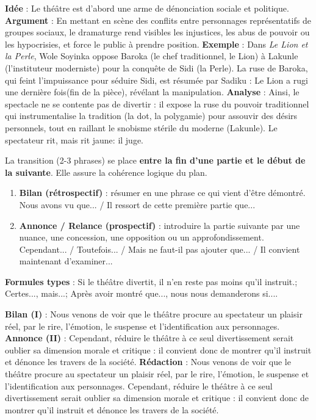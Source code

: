 \documentclass[11pt]{article}
\newcommand{\cle}[1]{{\popxbold\color{popdark}#1}}
\begin{document}
\begin{exoresolu}
\tcblower
\textbf{Idée} : Le théâtre est d'abord une arme de dénonciation sociale et politique.
\textbf{Argument} : En mettant en scène des conflits entre personnages représentatifs de groupes sociaux, le dramaturge rend visibles les injustices, les abus de pouvoir ou les hypocrisies, et force le public à prendre position.
\textbf{Exemple} : Dans \emph{Le Lion et la Perle}, Wole Soyinka oppose Baroka (le chef traditionnel, \og le Lion\fg) à Lakunle (l'instituteur moderniste) pour la conquête de Sidi (\og la Perle\fg). La ruse de Baroka, qui feint l'impuissance pour séduire Sidi, est résumée par Sadiku : \og Le Lion a rugi une dernière fois\fg (fin de la pièce), révélant la manipulation.
\textbf{Analyse} : Ainsi, le spectacle ne se contente pas de divertir : il expose la \cle{ruse du pouvoir traditionnel} qui instrumentalise la tradition (la dot, la polygamie) pour assouvir des désirs personnels, tout en raillant le \cle{snobisme stérile} du moderne (Lakunle). Le spectateur rit, mais rit \og jaune\fg : il juge.
\end{exoresolu}

\begin{methode}
La transition (2-3 phrases) se place \textbf{entre la fin d'une partie et le début de la suivante}. Elle assure la \cle{cohérence logique} du plan.
\begin{enumerate}
\item \textbf{Bilan (rétrospectif)} : résumer en une phrase ce qui vient d'être démontré. \og Nous avons vu que... / Il ressort de cette première partie que...\fg
\item \textbf{Annonce / Relance (prospectif)} : introduire la partie suivante par une nuance, une concession, une opposition ou un approfondissement. \og Cependant... / Toutefois... / Mais ne faut-il pas ajouter que... / Il convient maintenant d'examiner...\fg
\end{enumerate}
\textbf{Formules types} : \og Si le théâtre divertit, il n'en reste pas moins qu'il instruit.\fg ; \og Certes..., mais...\fg ; \og Après avoir montré que..., nous nous demanderons si...\fg.
\end{methode}

\begin{exoresolu}
\tcblower
\textbf{Bilan (I)} : Nous venons de voir que le théâtre procure au spectateur un plaisir réel, par le rire, l'émotion, le suspense et l'identification aux personnages.
\textbf{Annonce (II)} : Cependant, réduire le théâtre à ce seul divertissement serait oublier sa dimension morale et critique : il convient donc de montrer qu'il instruit et dénonce les travers de la société.
\textbf{Rédaction} : Nous venons de voir que le théâtre procure au spectateur un plaisir réel, par le rire, l'émotion, le suspense et l'identification aux personnages. Cependant, réduire le théâtre à ce seul divertissement serait oublier sa dimension morale et critique : il convient donc de montrer qu'il instruit et dénonce les travers de la société.
\end{exoresolu}
\end{document}
